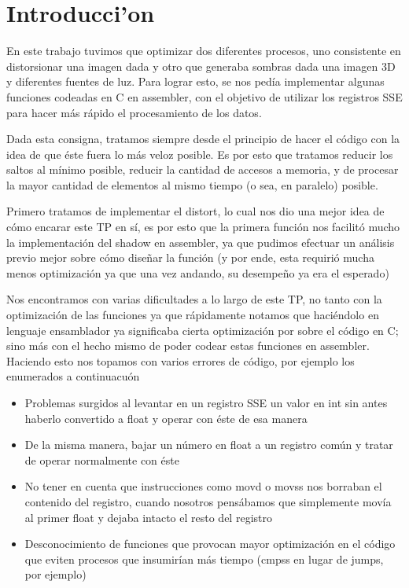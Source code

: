 \documentclass[a4paper,10pt]{article}
\title{}
\author{}
\date{}
\begin{document}
 	
\section{Introducci'on}

En este trabajo tuvimos que optimizar dos diferentes procesos, uno consistente en distorsionar una imagen dada y otro que generaba sombras dada una imagen 3D y diferentes fuentes de luz. Para lograr esto, se nos pedía implementar algunas funciones codeadas en C en assembler, con el objetivo de utilizar los registros SSE para hacer más rápido el procesamiento de los datos. 

Dada esta consigna, tratamos siempre desde el principio de hacer el código con la idea de que éste fuera lo más veloz posible. Es por esto que tratamos reducir los saltos al mínimo posible, reducir la cantidad de accesos a memoria, y de procesar la mayor cantidad de elementos al mismo tiempo (o sea, en paralelo) posible. 

Primero tratamos de implementar el distort, lo cual nos dio una mejor idea de cómo encarar este TP en sí, es por esto que la primera función nos facilitó mucho la implementación del shadow en assembler, ya que pudimos efectuar un análisis previo mejor sobre cómo diseñar la función (y por ende, esta requirió mucha menos optimización ya que una vez andando, su desempeño ya era el esperado)

Nos encontramos con varias dificultades a lo largo de este TP, no tanto con la optimización de las funciones ya que rápidamente notamos que haciéndolo en lenguaje ensamblador ya significaba cierta optimización por sobre el código en C; sino más con el hecho mismo de poder codear estas funciones en assembler. Haciendo esto nos topamos con varios errores de código, por ejemplo los enumerados a continuacuón

\begin{itemize}
 \item Problemas surgidos al levantar en un registro SSE un valor en int sin antes haberlo convertido a float y operar con éste de esa manera
\item De la misma manera, bajar un número en float a un registro común y tratar de operar normalmente con éste
\item No tener en cuenta que instrucciones como movd o movss nos borraban el contenido del registro, cuando nosotros pensábamos que simplemente movía al primer float y dejaba intacto el resto del registro
\item Desconocimiento de funciones que provocan mayor optimización en el código que eviten procesos que insumirían más tiempo (cmpss en lugar de jumps, por ejemplo)
\end{itemize}
\end{document}
